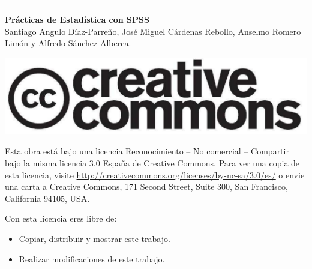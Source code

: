 \null
\vfill
\hrule depth 3pt
\smallskip

\noindent \textbf{Prácticas de Estadística con SPSS}\\
Santiago Angulo Díaz-Parreño, José Miguel Cárdenas Rebollo, Anselmo Romero Limón y Alfredo Sánchez Alberca.

\bigskip
\begin{center}
\includegraphics[scale=0.1]{img/cc-logo}
\end{center}

\small
Esta obra está bajo una licencia Reconocimiento --­ No comercial -- ­Compartir bajo la 
misma licencia 3.0 España de Creative Commons. Para ver una copia de esta 
licencia, visite \url{http://creativecommons.org/licenses/by-nc-sa/3.0/es/} o envie una 
carta a Creative Commons, 171 Second Street, Suite 300, San Francisco, California 
94105, USA.

\medskip
Con esta licencia eres libre de:
\begin{itemize}
\item Copiar, distribuir y mostrar este trabajo.
\item Realizar modificaciones de este trabajo.
\end{itemize}

